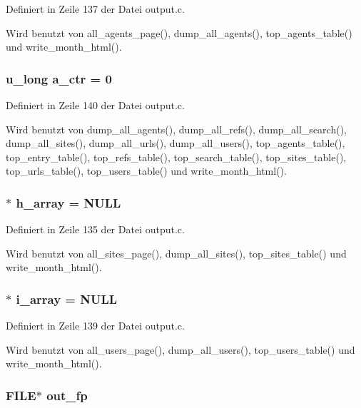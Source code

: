Definiert in Zeile 137 der Datei output.c.

Wird benutzt von all\_\-agents\_\-page(), dump\_\-all\_\-agents(), top\_\-agents\_\-table() und write\_\-month\_\-html().
\subsubsection{\setlength{\rightskip}{0pt plus 5cm}u\_\-long {\bf a\_\-ctr} = 0}\label{output_8c_e04d9715c55066e22dc7442b812c5d2c}




Definiert in Zeile 140 der Datei output.c.

Wird benutzt von dump\_\-all\_\-agents(), dump\_\-all\_\-refs(), dump\_\-all\_\-search(), dump\_\-all\_\-sites(), dump\_\-all\_\-urls(), dump\_\-all\_\-users(), top\_\-agents\_\-table(), top\_\-entry\_\-table(), top\_\-refs\_\-table(), top\_\-search\_\-table(), top\_\-sites\_\-table(), top\_\-urls\_\-table(), top\_\-users\_\-table() und write\_\-month\_\-html().
\subsubsection{$\ast$ {\bf h\_\-array} = NULL}\label{output_8c_5264e215246a79cb95e196368866f1ef}




Definiert in Zeile 135 der Datei output.c.

Wird benutzt von all\_\-sites\_\-page(), dump\_\-all\_\-sites(), top\_\-sites\_\-table() und write\_\-month\_\-html().
\subsubsection{$\ast$ {\bf i\_\-array} = NULL}\label{output_8c_ccdc7ee079826f4729bf0f653e9f29f1}




Definiert in Zeile 139 der Datei output.c.

Wird benutzt von all\_\-users\_\-page(), dump\_\-all\_\-users(), top\_\-users\_\-table() und write\_\-month\_\-html().
\subsubsection{\setlength{\rightskip}{0pt plus 5cm}FILE$\ast$ {\bf out\_\-fp}}\label{output_8c_c061fe683531313d6071980df0f82611}




